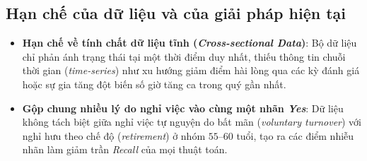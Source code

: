 \subsection{Hạn chế của dữ liệu và của giải pháp hiện tại}
\begin{itemize}
    \item \textbf{Hạn chế về tính chất dữ liệu tĩnh (\textit{Cross-sectional Data})}: Bộ dữ liệu chỉ phản ánh trạng thái tại một thời điểm duy nhất, thiếu thông tin chuỗi thời gian (\textit{time-series}) như xu hướng giảm điểm hài lòng qua các kỳ đánh giá hoặc sự gia tăng đột biến số giờ tăng ca trong quý gần nhất.
    \item \textbf{Gộp chung nhiều lý do nghỉ việc vào cùng một nhãn \textit{Yes}}: Dữ liệu không tách biệt giữa nghỉ việc tự nguyện do bất mãn (\textit{voluntary turnover}) với nghỉ hưu theo chế độ (\textit{retirement}) ở nhóm $55$--$60$ tuổi, tạo ra các điểm nhiễu nhãn làm giảm trần \textit{Recall} của mọi thuật toán.
\end{itemize}
